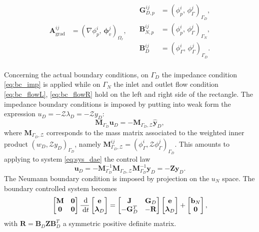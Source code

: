 \documentclass[aspectratio=169]{ISAE-Beamer}
\begin{document}
\begin{frame}
\begin{equation*}
\begin{aligned}
	\mathbf{A}_{\mathrm{grad}}^{ij} &= (\nabla{\phi}_{p}^{i}, \, \bm{\phi}_{v}^j)_{\Omega_r}, 
	\end{aligned} \quad 
	\begin{aligned}
	\mathbf{G}_{D, p}^{ij} &= ({\phi}_{p}^i,\, {\phi}_{\Gamma}^j)_{\Gamma_D}, \\ 
	\mathbf{B}_{N, p}^{ij} &= ({\phi}_{p}^{i},\, {\phi}_{\Gamma}^{j})_{\Gamma_N}, \\
	\mathbf{B}_{D}^{ij} &= ({\phi}_{\Gamma}^{i},\, {\phi}_{\Gamma}^{j})_{\Gamma_D}. \\
	\end{aligned}
	\end{equation*}
	
	
	Concerning the actual boundary conditions, on $\Gamma_D$ the impedance condition \eqref{eq:bc_imp} is applied while on  $\Gamma_N$ the inlet and outlet flow condition \eqref{eq:bc_flowL}, \eqref{eq:bc_flowR} hold on the left and right side of the rectangle. The impedance boundary conditions is imposed by putting into weak form the expression $u_D=-\mathcal{Z}\lambda_D=-\mathcal{Z}y_D$:
	\[ \mathbf{M}_{\Gamma_D} \mathbf{u}_D = - \mathbf{M}_{\Gamma_D, \mathcal{Z}} \widehat{\mathbf{y}}_D,
	\]
	where $\mathbf{M}_{\Gamma_D, \mathcal{Z}}$ corresponds to the mass matrix associated to the weighted inner product $\left(w_D, \mathcal{Z}  y_D\right)_{\Gamma_D}$, namely $\mathbf{M}_{\Gamma_D, \mathcal{Z}}^{ij} = \left(\phi_\Gamma^i, \mathcal{Z}  \phi_\Gamma^j \right)_{\Gamma_D}$. This amounts to applying to system \eqref{eq:sys_dae} the control law
	\[ \mathbf{u}_D = - \mathbf{M}_{\Gamma_D}^{-1} \mathbf{M}_{\Gamma_D, \mathcal{Z}} \mathbf{M}_{\Gamma_D}^{-1} \mathbf{y}_D = -\mathbf{Z} \mathbf{y}_D.
	\]
	The Neumann boundary condition is imposed by projection on the $u_N$ space.   The boundary controlled system becomes   
	\begin{equation}
	\label{eq:sys_dae}
	\begin{bmatrix}
	\mathbf{M} & \mathbf{0} \\
	\mathbf{0} & \mathbf{0} \\
	\end{bmatrix} \frac{\d}{\d t}
	\begin{bmatrix}
	\mathbf{e}\\
	\bm{\lambda}_D \\
	\end{bmatrix}
	= \begin{bmatrix}
	\mathbf{J} & \mathbf{G}_D\\
	-\mathbf{G}_D^T & -\mathbf{R} \\
	\end{bmatrix}
	\begin{bmatrix}
	\mathbf{e}\\
	\bm{\lambda}_D \\
	\end{bmatrix} + \begin{bmatrix}
	\mathbf{b}_N \\
	\mathbf{0} \\
	\end{bmatrix},
	\end{equation}
	with $\mathbf{R} = \mathbf{B}_D \mathbf{Z} \mathbf{B}_D^T$ a symmetric positive definite matrix. 
	

\end{frame}
\end{document}
